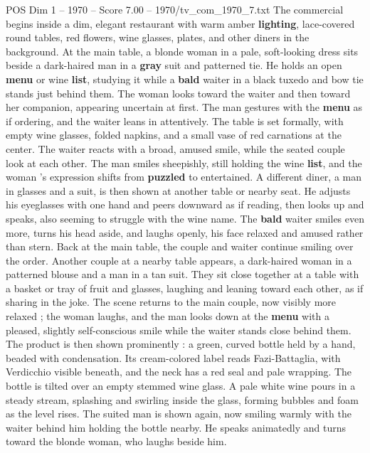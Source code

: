 \begin{textsample}{POS Dim 1 – 1970 – Score 7.00 – 1970/tv\_com\_1970\_7.txt}  \label{ex:f1_pos_064}
The commercial begins inside a dim, elegant restaurant with warm amber \textbf{lighting}, lace-covered round tables, red flowers, wine glasses, plates, and other diners in the background.
At the main table, a blonde woman in a pale, soft-looking dress sits beside a dark-haired man in a \textbf{gray} suit and patterned tie.
He holds an open \textbf{menu} or wine \textbf{list}, studying it while a \textbf{bald} waiter in a black tuxedo and bow tie stands just behind them.
The woman looks toward the waiter and then toward her companion, appearing uncertain at first.
The man gestures with the \textbf{menu} as if ordering, and the waiter leans in attentively.
The table is set formally, with empty wine glasses, folded napkins, and a small vase of red carnations at the center.
The waiter reacts with a broad, amused smile, while the seated couple look at each other.
The man smiles sheepishly, still holding the wine \textbf{list}, and the woman ’s expression shifts from \textbf{puzzled} to entertained.
A different diner, a man in glasses and a suit, is then shown at another table or nearby seat.
He adjusts his eyeglasses with one hand and peers downward as if reading, then looks up and speaks, also seeming to struggle with the wine name.
The \textbf{bald} waiter smiles even more, turns his head aside, and laughs openly, his face relaxed and amused rather than stern.
Back at the main table, the couple and waiter continue smiling over the order.
Another couple at a nearby table appears, a dark-haired woman in a patterned blouse and a man in a tan suit.
They sit close together at a table with a basket or tray of fruit and glasses, laughing and leaning toward each other, as if sharing in the joke.
The scene returns to the main couple, now visibly more relaxed ; the woman laughs, and the man looks down at the \textbf{menu} with a pleased, slightly self-conscious smile while the waiter stands close behind them.
The product is then shown prominently : a green, curved bottle held by a hand, beaded with condensation.
Its cream-colored label reads Fazi-Battaglia, with Verdicchio visible beneath, and the neck has a red seal and pale wrapping.
The bottle is tilted over an empty stemmed wine glass.
A pale white wine pours in a steady stream, splashing and swirling inside the glass, forming bubbles and foam as the level rises.
The suited man is shown again, now smiling warmly with the waiter behind him holding the bottle nearby.
He speaks animatedly and turns toward the blonde woman, who laughs beside him.

\end{textsample}
